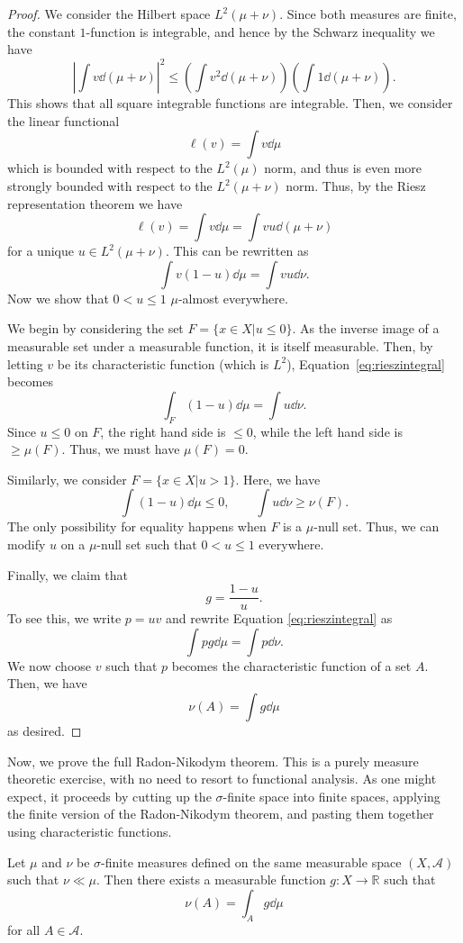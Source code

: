 \documentclass[twoside,symmetric, openany, 12pt]{./tuftebook}
\theoremstyle{definition}
\theoremstyle{definition}
\theoremstyle{definition}
\newcommand{\R}{\mathbb{R}}
\begin{document}
\begin{proof}
	We consider the Hilbert space $L^2(\mu+\nu)$. Since both measures are finite, the constant $1$-function is integrable, and hence by the Schwarz inequality we have
	\[\left|\int v \dd{(\mu+\nu)}\right|^2 \le \left(\int v^2 \dd{(\mu+\nu)}\right) \left(\int 1\dd{(\mu+\nu)}\right).\]
	This shows that all square integrable functions are integrable. Then, we consider the linear functional
	\[\ell(v) = \int v \dd{\mu}\]
	which is bounded with respect to the $L^2(\mu)$ norm, and thus is even more strongly bounded with respect to the $L^2(\mu+\nu)$ norm. Thus, by the Riesz representation theorem we have
	\[\ell(v) = \int v\dd{\mu} = \int vu \dd{(\mu+\nu)}\]
	for a unique $u\in L^2(\mu+\nu)$. This can be rewritten as
	\begin{equation}\label{eq:rieszintegral}
		\int v(1-u)\dd{\mu}=\int vu \dd{\nu}.
		\end{equation}
	Now we show that $0 < u \le 1$ $\mu$-almost everywhere.
	
	We begin by considering the set $F = \{x\in X|u \le 0\}$. As the inverse image of a measurable set under a measurable function, it is itself measurable. Then, by letting $v$ be its characteristic function (which is $L^2$), Equation~\eqref{eq:rieszintegral} becomes
	\[\int_F (1-u)\dd{\mu} = \int u \dd{\nu}.\]
	Since $u\le 0$ on $F$, the right hand side is $\le 0$, while the left hand side is $\ge \mu(F)$. Thus, we must have $\mu(F)=0$.
	
	Similarly, we consider $F=\{x \in X|u > 1\}$. Here, we have
	\[\int (1-u)\dd{\mu} \le 0, \qquad \int u \dd{\nu} \ge \nu(F).\]
	The only possibility for equality happens when $F$ is a $\mu$-null set. Thus, we can modify $u$ on a $\mu$-null set such that $0< u \le 1$ everywhere.
	
	Finally, we claim that
	\[g = \frac{1-u}{u}.\]
	To see this, we write $p = uv$ and rewrite Equation \eqref{eq:rieszintegral} as
	\[\int pg \dd{\mu} = \int p \dd{\nu}.\]
	We now choose $v$ such that $p$ becomes the characteristic function of a set $A$. Then, we have
	\[\nu(A) = \int g \dd{\mu}\]
	as desired.
\end{proof}
Now, we prove the full Radon-Nikodym theorem. This is a purely measure theoretic exercise, with no need to resort to functional analysis. As one might expect, it proceeds by cutting up the $\sigma$-finite space into finite spaces, applying the finite version of the Radon-Nikodym theorem, and pasting them together using characteristic functions.
\begin{Theorem}
	Let $\mu$ and $\nu$ be $\sigma$-finite measures defined on the same measurable space $(X, \mathcal{A})$ such that $\nu\ll \mu$. Then there exists a measurable function $g:X\to \R$ such that
	\[\nu(A) = \int_A g\dd{\mu}\]
	for all $A\in \mathcal{A}$.
\end{Theorem}
\end{document}
